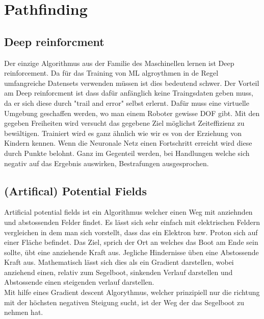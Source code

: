 \section{Pathfinding}


\subsection{Deep reinforcment}
Der einzige Algorithmus aus der Familie des Maschinellen lernen ist Deep reinforcement. Da für das Training von ML algroythmen in de Regel umfangreiche Datensets verwenden müssen ist dies bedeutend schwer. Der Vorteil am Deep reinforcment ist dass dafür anfänglich keine Traingsdaten geben muss, da er sich diese durch "trail and error" selbst erlernt. Dafür muss eine virtuelle Umgebung geschaffen werden, wo man einem Roboter gewisse DOF gibt. Mit den gegeben Freiheiten wird versucht das gegebene Ziel möglichst Zeiteffizienz zu bewältigen. Trainiert wird es ganz ähnlich wie wir es von der Erziehung von Kindern kennen. Wenn die Neuronale Netz einen Fortschritt erreicht wird diese durch Punkte belohnt. Ganz im Gegenteil werden, bei Handlungen welche sich negativ auf das Ergebnis auswirken, Bestrafungen ausgesprochen.

\subsection{(Artifical) Potential Fields }
Artificial potential fields ist ein Algorithmus  welcher einen Weg mit anziehnden und abstossenden Felder findet. Es lässt sich sehr einfach mit elektrischen Feldern vergleichen in dem man sich vorstellt, dass das ein Elektron bzw. Proton sich auf einer Fläche befindet. Das Ziel, sprich der Ort an welches das Boot am Ende sein sollte, übt eine anziehende Kraft aus. Jegliche Hindernisse üben eine Abstossende Kraft aus. Mathematisch lässt sich dies als ein Gradient darstellen, wobei anziehend einen, relativ zum Segelboot, sinkenden Verlauf darstellen und Abstossende einen steigenden verlauf darstellen.
\\ 
Mit hilfe eines Gradient descent Algorythmus, welcher prinzipiell nur die richtung mit der höchsten negativen Steigung sucht, ist der Weg der das Segelboot zu nehmen hat.



